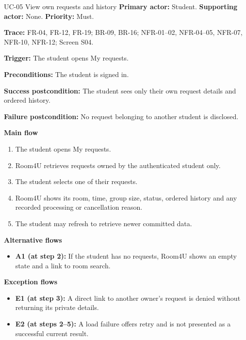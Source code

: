 \begin{usecasebox}{UC-05 View own requests and history}
\noindent\textbf{Primary actor:} Student.\quad
\textbf{Supporting actor:} None.\quad
\textbf{Priority:} Must.\par
\textbf{Trace:} FR-04, FR-12, FR-19; BR-09, BR-16; NFR-01--02, NFR-04--05, NFR-07, NFR-10, NFR-12; Screen S04.\par
\textbf{Trigger:} The student opens My requests.\par
\textbf{Preconditions:} The student is signed in.\par
\textbf{Success postcondition:} The student sees only their own request details and ordered history.\par
\textbf{Failure postcondition:} No request belonging to another student is disclosed.\par
\textbf{Main flow}
\begin{enumerate}[label=\arabic*.,leftmargin=2em,itemsep=1pt,topsep=2pt]
  \item The student opens My requests.
  \item Room4U retrieves requests owned by the authenticated student only.
  \item The student selects one of their requests.
  \item Room4U shows its room, time, group size, status, ordered history and any recorded processing or cancellation reason.
  \item The student may refresh to retrieve newer committed data.
\end{enumerate}
\textbf{Alternative flows}
\begin{itemize}[label={},leftmargin=0pt,itemsep=1pt,topsep=1pt]
  \item \textbf{A1 (at step 2):} If the student has no requests, Room4U shows an empty state and a link to room search.
\end{itemize}
\textbf{Exception flows}
\begin{itemize}[label={},leftmargin=0pt,itemsep=1pt,topsep=1pt]
  \item \textbf{E1 (at step 3):} A direct link to another owner's request is denied without returning its private details.
  \item \textbf{E2 (at steps 2--5):} A load failure offers retry and is not presented as a successful current result.
\end{itemize}
\end{usecasebox}

